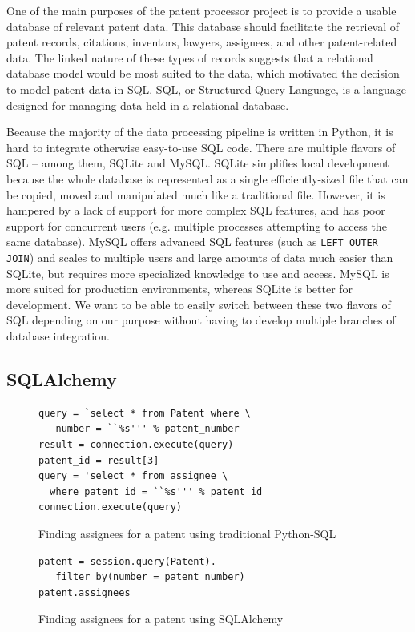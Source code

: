 One of the main purposes of the patent processor project is to provide a usable
database of relevant patent data. This database should facilitate the retrieval
of patent records, citations, inventors, lawyers, assignees, and other
patent-related data. The linked nature of these types of records suggests that
a relational database model would be most suited to the data, which motivated
the decision to model patent data in SQL. SQL, or Structured Query Language, is
a language designed for managing data held in a relational database.

Because the majority of the data processing pipeline is written in Python, it
is hard to integrate otherwise easy-to-use SQL code. There are multiple flavors
of SQL -- among them, SQLite and MySQL. SQLite simplifies local development
because the whole database is represented as a single efficiently-sized file
that can be copied, moved and manipulated much like a traditional file.
However, it is hampered by a lack of support for more complex SQL features, and
has poor support for concurrent users (e.g. multiple processes attempting to
access the same database). MySQL offers advanced SQL features (such as
\verb`LEFT OUTER JOIN`) and scales to multiple users and large amounts of data
much easier than SQLite, but requires more specialized knowledge to use and
access. MySQL is more suited for production environments, whereas SQLite is
better for development. We want to be able to easily switch between these two
flavors of SQL depending on our purpose without having to develop multiple
branches of database integration.

\subsection{SQLAlchemy}

\begin{figure}
\begin{lstlisting}
query = `select * from Patent where \
   number = ``%s''' % patent_number
result = connection.execute(query)
patent_id = result[3]
query = 'select * from assignee \
  where patent_id = ``%s''' % patent_id
connection.execute(query)
\end{lstlisting}
\label{fig:sql-assignee}
\caption{Finding assignees for a patent using traditional Python-SQL}
\end{figure}

\begin{figure}
\begin{lstlisting}
patent = session.query(Patent).
   filter_by(number = patent_number)
patent.assignees
\end{lstlisting}
\label{fig:sa-assignee}
\caption{Finding assignees for a patent using SQLAlchemy}
\end{figure}

